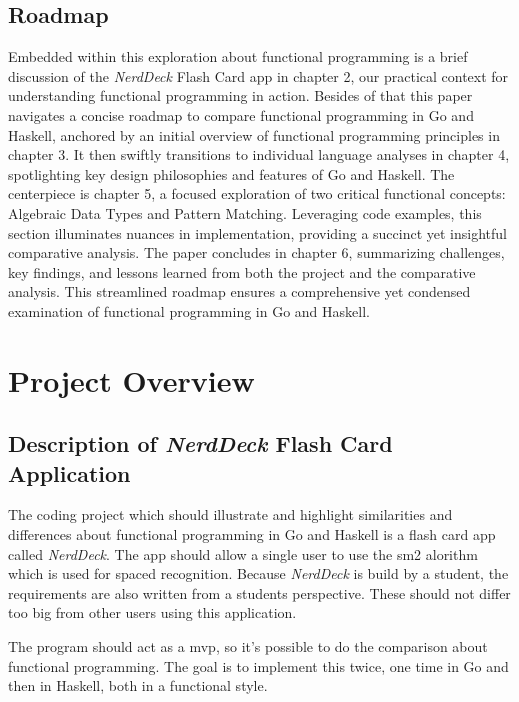     \section{Roadmap}\label{sec:roadmap}
    Embedded within this exploration about functional programming is a brief discussion of the \textit{NerdDeck} Flash Card \ac{app} in chapter 2, our practical context for understanding functional programming in action. Besides of that this paper navigates a concise roadmap to compare functional programming in Go and Haskell, anchored by an initial overview of functional programming principles in chapter 3. It then swiftly transitions to individual language analyses in chapter 4, spotlighting key design philosophies and features of Go and Haskell. The centerpiece is chapter 5, a focused exploration of two critical functional concepts: Algebraic Data Types and Pattern Matching. Leveraging code examples, this section illuminates nuances in implementation, providing a succinct yet insightful comparative analysis. The paper concludes in chapter 6, summarizing challenges, key findings, and lessons learned from both the project and the comparative analysis. This streamlined roadmap ensures a comprehensive yet condensed examination of functional programming in Go and Haskell.

\chapter{Project Overview}\label{chap:project-overview}
    \section{Description of \textit{NerdDeck} Flash Card Application}\label{sec:description}
    The coding project which should illustrate and highlight similarities and differences about functional programming in Go and Haskell is a flash card \ac{app} called \textit{NerdDeck}. The \ac{app} should allow a single user to use the \ac{sm2} alorithm which is used for spaced recognition.\cite{sm2} Because \textit{NerdDeck} is build by a student, the requirements are also written from a students perspective. These should not differ too big from other users using this application.

    The program should act as a \ac{mvp}, so it's possible to do the comparison about functional programming. The goal is to implement this twice, one time in Go and then in Haskell, both in a functional style.

